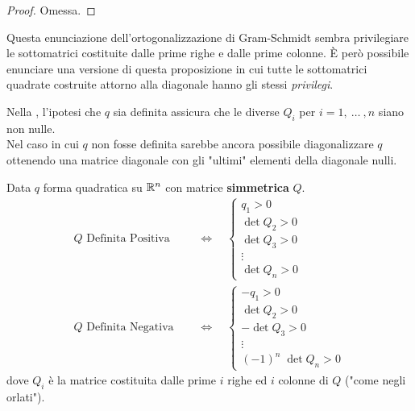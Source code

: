 \begin{appendices}
\begin{proposition}
\begin{center}
	\end{center}
	\begin{proof}
		Omessa.
	\end{proof}
	\begin{note}
		Questa enunciazione dell'ortogonalizzazione di Gram-Schmidt sembra privilegiare le sottomatrici costituite dalle prime
		righe e dalle prime colonne. È però possibile enunciare una versione di questa proposizione in cui tutte le sottomatrici
		quadrate costruite attorno alla diagonale hanno gli stessi \textit{privilegi}.
	\end{note}
\end{proposition}
\begin{observation}
	Nella , l'ipotesi che $q$ sia definita assicura che le diverse $Q_i$ per $i = 1,\:\dotsc\:,n$ siano non nulle.\\
	Nel caso in cui $q$ non fosse definita sarebbe ancora possibile diagonalizzare $q$ ottenendo una matrice diagonale con gli "ultimi" elementi
	della diagonale nulli.
\end{observation}
\begin{corollary}
	\label{coro:def_pos_neg_segni_Q}
	Data $q$ forma quadratica su $\mathbb{R}^n$ con matrice \textbf{simmetrica} $Q$.
	\begin{align*}
		Q \text{ Definita Positiva }
		\quad &\iff \quad
		\begin{cases}
			q_1 > 0\\
			\det Q_2 > 0\\
			\det Q_3 > 0\\
			\vdots\\
			\det Q_n > 0
		\end{cases}\\
		Q \text{ Definita Negativa }
		\quad &\iff \quad
		\begin{cases}
			-q_1 > 0\\
			\det Q_2 > 0\\
			-\det Q_3 > 0\\
			\vdots\\
			(-1)^n \; \det Q_n > 0
		\end{cases}
	\end{align*}
	dove $Q_i$ è la matrice costituita dalle prime $i$ righe ed $i$ colonne di $Q$ ("come negli orlati").


\end{corollary}
\end{appendices}
